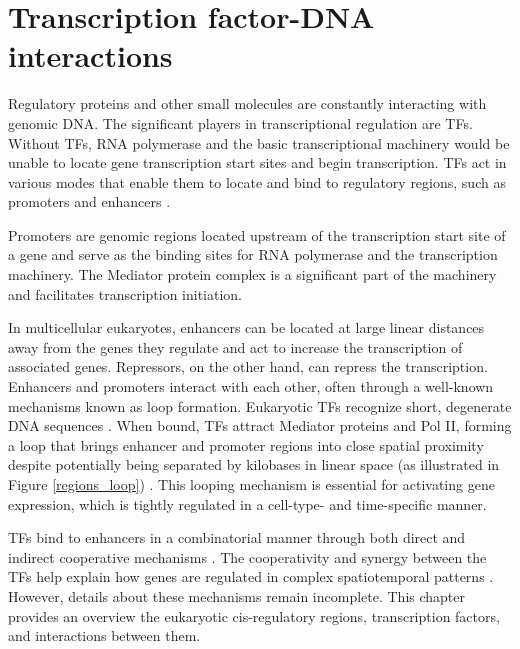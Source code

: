 \chapter{Transcription factor-DNA interactions}

Regulatory proteins and other small molecules are constantly interacting with genomic DNA. The significant players in transcriptional regulation are \ac{TFs}. Without TFs, RNA polymerase and the basic transcriptional machinery would be unable to locate gene transcription start sites and begin transcription. TFs act in various modes that enable them to locate and bind to regulatory regions, such as promoters and enhancers \cite{haberle2016promoter,smith2014enhancer,krivega2012enhancer}.

Promoters are genomic regions located upstream of the transcription start site of a gene and serve as the binding sites for RNA polymerase and the transcription machinery. The Mediator protein complex is a significant part of the machinery and facilitates transcription initiation.

In multicellular eukaryotes, enhancers can be located at large linear distances away from the genes they regulate and act to increase the transcription of associated genes. Repressors, on the other hand, can repress the transcription. Enhancers and promoters interact with each other, often through a well-known mechanisms known as loop formation. Eukaryotic TFs recognize short, degenerate DNA sequences \cite{bragdon2023cooperative}. When bound, TFs attract Mediator proteins and Pol II, forming a loop that brings enhancer and promoter regions into close spatial proximity despite potentially being separated by kilobases in linear space (as illustrated in {Figure \ref{regions_loop}}) \cite{krivega2012enhancer}. This looping mechanism is essential for activating gene expression, which is tightly regulated in a cell-type- and time-specific manner.

TFs bind to enhancers in a combinatorial manner through both direct and indirect cooperative mechanisms \cite{spitz2012transcription,bragdon2023cooperative}. The cooperativity and synergy between the TFs help explain how genes are regulated in complex spatiotemporal patterns \cite{lambert2018human}. However, details about these mechanisms remain incomplete. This chapter provides an overview the eukaryotic cis-regulatory regions, transcription factors, and interactions between them.

